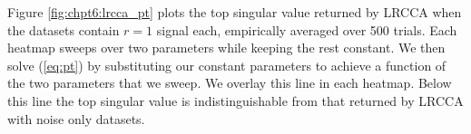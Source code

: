 Figure \ref{fig:chpt6:lrcca_pt} plots the top singular value returned by LRCCA when the datasets
contain $r=1$ signal each, empirically averaged over 500 trials. Each heatmap sweeps over
two parameters while keeping the rest constant. We then solve (\ref{eq:pt}) by
substituting our constant parameters to achieve a function of the two parameters that we
sweep. We overlay this line in each heatmap. Below this line the
top singular value is indistinguishable from that returned by LRCCA with noise only
datasets.

\begin{figure}[!htbp]
  \centering
\end{figure}
